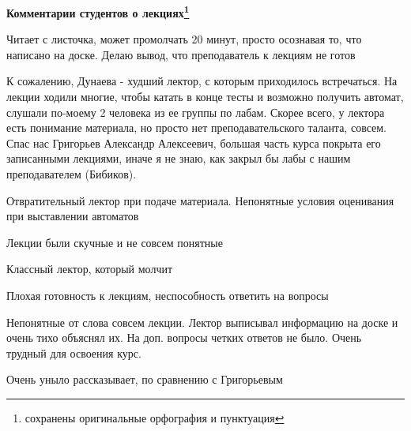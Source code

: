 		\textbf{Комментарии студентов о лекциях\protect\footnote{сохранены оригинальные орфография и пунктуация}}
            \begin{commentbox} 
                Читает с листочка, может промолчать 20 минут, просто осознавая то, что написано на доске. Делаю вывод, что преподаватель к лекциям не готов 
            \end{commentbox} 
        
            \begin{commentbox} 
                К сожалению, Дунаева - худший лектор, с которым приходилось встречаться. На лекции ходили многие, чтобы катать в конце тесты и возможно получить автомат, слушали по-моему 2 человека из ее группы по лабам. Скорее всего, у лектора есть понимание материала, но просто нет преподавательского таланта, совсем. Спас нас Григорьев Александр Алексеевич, большая часть курса покрыта его записанными лекциями, иначе я не знаю, как закрыл бы лабы с нашим преподавателем (Бибиков).  
            \end{commentbox} 
        
            \begin{commentbox} 
                Отвратительный лектор при подаче материала. Непонятные условия оценивания при выставлении автоматов 
            \end{commentbox} 
        
            \begin{commentbox} 
                Лекции были скучные и не совсем понятные 
            \end{commentbox} 
        
            \begin{commentbox} 
                Классный лектор, который молчит 
            \end{commentbox} 
        
            \begin{commentbox} 
                Плохая готовность к лекциям, неспособность ответить на вопросы 
            \end{commentbox} 
        
            \begin{commentbox} 
                Непонятные от слова совсем лекции. Лектор выписывал информацию на доске и очень тихо объяснял их. На доп. вопросы четких ответов не было. Очень трудный для освоения курс. 
            \end{commentbox} 
        
            \begin{commentbox} 
                Очень уныло рассказывает, по сравнению с Григорьевым  
            \end{commentbox} 
        
